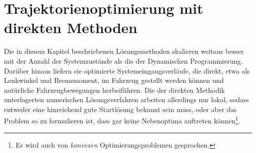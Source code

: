% 
\chapter{Trajektorienoptimierung mit direkten Methoden} \label{chap:dynamische_Optimierung_direkt}
%


Die in diesem Kapitel beschriebenen Lösungsmethoden skalieren weitaus besser mit der Anzahl der Systemzustände als die der Dynamischen Programmierung. Darüber hinaus liefern sie optimierte Systemeingangsverläufe, die direkt, etwa als Lenkwinkel und Bremsmoment, im Fahrzeug gestellt werden können und natürliche Fahrzeugbewegungen herbeiführen. Die der direkten Methodik unterlagerten numerischen Lösungsverfahren arbeiten allerdings nur lokal, sodass entweder eine hinreichend gute Startlösung bekannt sein muss, oder aber das Problem so zu formulieren ist, dass gar keine Nebenoptima auftreten können\footnote{Es wird auch von \emph{konvexen} Optimierungsproblemen gesprochen.}.

